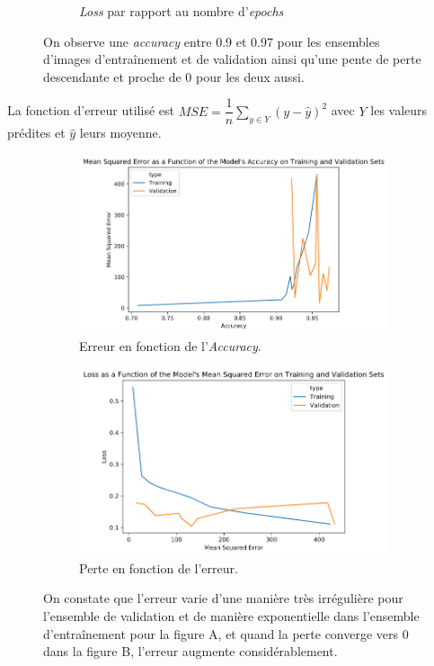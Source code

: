 \documentclass[french]{article}
\theoremstyle{mytheoremstyle}
\theoremstyle{mytheoremstyle}
\theoremstyle{myproblemstyle}
\begin{document}
\begin{figure}[H]
\begin{subfigure}[t]{0.5\textwidth}
            \caption{\emph{Loss} par rapport au nombre d'\emph{epochs}}
    \end{subfigure}
    \caption{On observe une \emph{accuracy} entre 0.9 et 0.97 pour les ensembles d'images d'entraînement et de validation ainsi qu'une pente de perte descendante et proche de 0 pour les deux aussi.}
    \end{figure}

   	La fonction d'erreur utilisé est $MSE = \dfrac{1}{n}\sum\limits_{y \in Y} (y - \hat{y})^2$ avec $Y$ les valeurs prédites et $\hat{y}$ leurs moyenne.
    
    \begin{figure}[H]
    \centering
    \begin{subfigure}[t]{0.5\textwidth}
            \centering
            \includegraphics[width=1\linewidth]{images/cnn_mse_acc.png}
            \caption{Erreur en fonction de l'\emph{Accuracy}.}
    \end{subfigure}%
    \begin{subfigure}[t]{0.5\textwidth}
            \centering
            \includegraphics[width=0.95\linewidth]{images/cnn_loss_mse.png}
            \caption{Perte en fonction de l'erreur.}
    \end{subfigure}
    \caption{On constate que l'erreur varie d'une manière très irrégulière pour l'ensemble de validation et de manière exponentielle dans l'ensemble d'entraînement pour la figure A, et quand la perte converge vers 0 dans la figure B, l'erreur augmente considérablement.}
    \end{figure}
    
\end{document}

